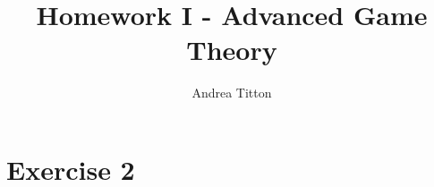 \documentclass[american]{scrartcl}
\title{Homework I - Advanced Game Theory }
\author{Andrea Titton}
\begin{document}

\maketitle
\newpage

\section*{Exercise 2}
\end{document}
